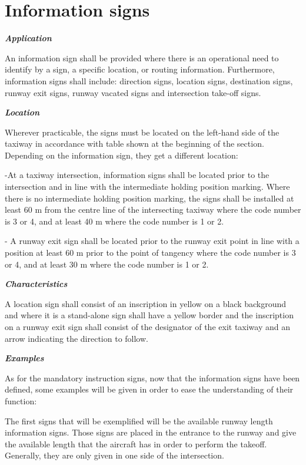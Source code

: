 	\section{Information signs}
	\textbf{\textit{Application}}
	
	An information sign shall be provided where there is an operational need to identify by a sign, a specific location, or routing information. Furthermore, information signs shall include: direction signs, location signs, destination signs, runway exit signs, runway vacated signs and intersection take-off signs.
	
	\textbf{\textit{Location}}
	
	Wherever practicable, the signs must be located on the left-hand side of the taxiway in accordance with table shown at the beginning of the section. Depending on the information sign, they get a different location:
	
	-At a taxiway intersection, information signs shall be located prior to the intersection and in line with the intermediate holding position marking. Where there is no intermediate holding position marking, the signs shall be installed at least 60 m from the centre line of the intersecting taxiway where the code number is 3 or 4, and at least 40 m where the code number is 1 or 2.
	
	- A runway exit sign shall be located prior to the runway exit point in line with a position at least 60 m prior to the point of tangency where the code number is 3 or 4, and at least 30 m where the code number is 1 or 2.
	
	\textbf{\textit{Characteristics}}
	
	A location sign shall consist of an inscription in yellow on a black background and where it is a stand-alone sign shall have a yellow border and the inscription on a runway exit sign shall consist of the designator of the exit taxiway and an arrow indicating the direction to follow.
	
	\textbf{\textit{Examples}}
	
	As for the mandatory instruction signs, now that the information signs have been defined, some examples will be given in order to ease the understanding of their function: 
	
	The first signs that will be exemplified will be the available runway length information signs. Those signs are placed in the entrance to the runway and give the available length that the aircraft has in order to perform the takeoff. Generally, they are only given in one side of the intersection. 
	
